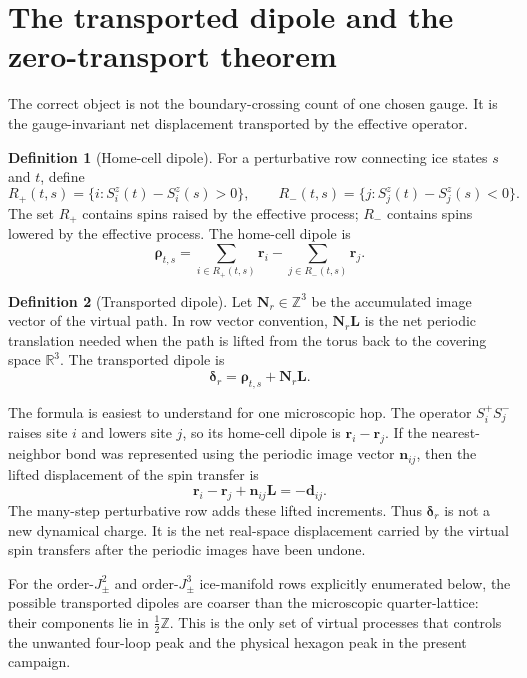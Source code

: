 \documentclass[11pt,letterpaper]{article}
\newcommand{\Jpm}{J_{\pm}}
\newcommand{\bd}{\bm d}
\newcommand{\bn}{\bm n}
\newcommand{\bN}{\bm N}
\newcommand{\bL}{\bm L}
\newcommand{\br}{\bm r}
\newcommand{\brho}{\bm \rho}
\newcommand{\bdelta}{\bm \delta}
\newcommand{\Z}{\mathbb Z}
\theoremstyle{plain}
\theoremstyle{definition}
\newtheorem{definition}{Definition}
\begin{document}
\section{The transported dipole and the zero-transport theorem}
\label{sec:transported-dipole}

The correct object is not the boundary-crossing count of one chosen gauge.
It is the gauge-invariant net displacement transported by the effective
operator.

\begin{definition}[Home-cell dipole]
For a perturbative row connecting ice states $s$ and $t$, define
\[
R_+(t,s)=\{i:S_i^z(t)-S_i^z(s)>0\},\qquad
R_-(t,s)=\{j:S_j^z(t)-S_j^z(s)<0\}.
\]
The set $R_+$ contains spins raised by the effective process; $R_-$ contains
spins lowered by the effective process.  The home-cell dipole is
\begin{equation}
\brho_{t,s}=\sum_{i\in R_+(t,s)}\br_i-\sum_{j\in R_-(t,s)}\br_j .
\label{eq:rho_def}
\end{equation}
\end{definition}

\begin{definition}[Transported dipole]
Let $\bN_r\in\Z^3$ be the accumulated image vector of the virtual path.  In row
vector convention, $\bN_r\bL$ is the net periodic translation needed when the
path is lifted from the torus back to the covering space $\mathbb R^3$.  The
transported dipole is
\begin{equation}
\boxed{
\bdelta_r=\brho_{t,s}+\bN_r\bL .
}
\label{eq:delta_def}
\end{equation}
\end{definition}

The formula is easiest to understand for one microscopic hop.  The operator
$S_i^+S_j^-$ raises site $i$ and lowers site $j$, so its home-cell dipole is
$\br_i-\br_j$.  If the nearest-neighbor bond was represented using the periodic
image vector $\bn_{ij}$, then the lifted displacement of the spin transfer is
\[
\br_i-\br_j+\bn_{ij}\bL=-\bd_{ij}.
\]
The many-step perturbative row adds these lifted increments.  Thus
$\bdelta_r$ is not a new dynamical charge.  It is the net real-space
displacement carried by the virtual spin transfers after the periodic images
have been undone.

For the order-$\Jpm^2$ and order-$\Jpm^3$ ice-manifold rows explicitly
enumerated below, the possible transported dipoles are coarser than the
microscopic quarter-lattice: their components lie in $\frac12\Z$.  This is the
only set of virtual processes that controls the unwanted four-loop peak and
the physical hexagon peak in the present campaign.
\end{document}
